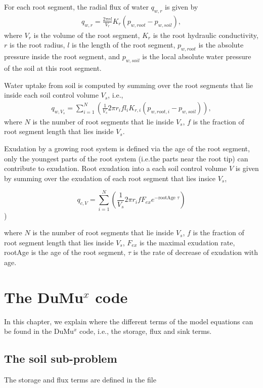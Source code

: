 For each root segment, the radial flux of water $q_{w,r}$ is given by 
\begin{eqnarray}
q_{w,r}=\frac{2\pi rl}{V_r}K_{r}(p_{w,root}-p_{w,soil}),
\end{eqnarray}
where $V_r$ is the volume of the root segment, $K_{r}$ is the root hydraulic conductivity, $r$ is the root
radius, $l$ is the length of the root segment, $p_{w,root}$ is the absolute pressure inside the root segment, and $p_{w,soil}$ is the local absolute water pressure of the soil at this root segment.

Water uptake from soil is computed by summing over the root segments that lie inside each soil control volume $V_s$, i.e.,
\begin{eqnarray}
q_{w,V_s}=\sum_{i=1}^{N}\left(\frac{1}{V_s}2\pi r_{i}fl_{i}K_{r,i}(p_{w,root,i}-p_{w,soil})\right),
\end{eqnarray}
where $N$ is the number of root segments that lie inside $V_s$, $f$ is the fraction of root segment length that lies inside $V_s$.

Exudation by a growing root system is defined via the age of the root segment, only the youngest parts of the root system (i.e.the parts near the root tip) can contribute to exudation. 
Root exudation into a each soil control volume $V$ is given by summing over the exudation of each root segment that lies insice $V_s$, 

\[
q_{c,V}=\sum_{i=1}^{N}\left(\frac{1}{V_s}2\pi r_{i}f F_{ex} e^{-\text{rootAge } \tau} \right)
\])

where $N$ is the number of root segments that lie inside $V_s$, $f$ is the fraction of root segment length that lies inside $V_s$, $F_{ex}$ is the maximal exudation rate, rootAge is the age of the root segment, $\tau$ is the rate of decrease of exudation with age.

\section*{The DuMu$^{x}$ code}

In this chapter, we explain where the different terms of the model
equations can be found in the DuMu$^{x}$ code, i.e., the storage,
flux and sink terms.

\subsection*{The soil sub-problem}

The storage and flux terms are defined in the file

